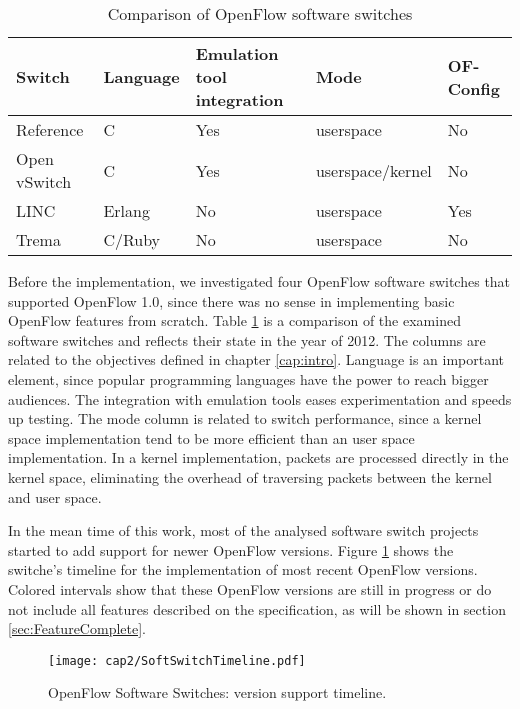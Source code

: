 \begin{table}[H]
\caption{Comparison of OpenFlow software switches}
\label{tab:relatedswitches}
\begin{tabular}{|l|l|l|l|l|}
\hline
\textbf{Switch} & \textbf{Language} & \textbf{Emulation tool integration} & \textbf{Mode}    & \textbf{OF-Config} \\ \hline
Reference       & C                 & Yes                        & userspace        & No                         \\ \hline
Open vSwitch    & C                 & Yes                        & userspace/kernel & No                         \\ \hline
LINC            & Erlang            & No                    & userspace        & Yes                        \\ \hline
Trema           & C/Ruby            & No                    & userspace        & No                         \\ \hline
\end{tabular}
\end{table}

Before the implementation, we investigated four OpenFlow software switches that supported OpenFlow 1.0, since there was no sense in implementing basic OpenFlow features from scratch. Table \ref{tab:relatedswitches} is a comparison of the examined software switches and reflects their state in the year of 2012. The columns are related to the objectives defined in chapter \ref{cap:intro}. Language is an important element, since popular programming languages have the power to reach bigger audiences. The integration with emulation tools eases experimentation and speeds up testing. The mode column is related to switch performance, since a kernel space implementation tend to be more efficient than an user space implementation. In a kernel implementation, packets are processed directly in the kernel space, eliminating the overhead of traversing packets between the kernel and user space.

In the mean time of this work, most of the analysed software switch projects started to add support for newer OpenFlow versions. Figure \ref{fig:ofswitchtimeline} shows the switche's timeline for the implementation of most recent OpenFlow versions. Colored intervals show that these OpenFlow versions are still in progress or do not include all features described on the specification, as will be shown in section \ref{sec:FeatureComplete}.

\begin{figure}[H]
\centering
\texttt{[image: cap2/SoftSwitchTimeline.pdf]}
\caption{OpenFlow Software Switches: version support timeline.}
\label{fig:ofswitchtimeline}
\end{figure}

